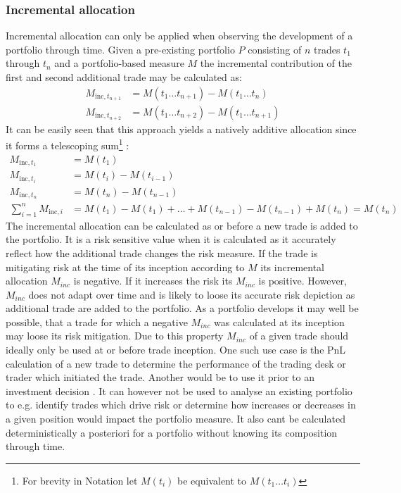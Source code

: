 \documentclass[12pt,a4paper]{article}
\let\footnoteOld\footnote		%
\renewcommand{\footnote}[1]{\linespread{1.0}\footnoteOld{#1}\linespread{1.2}}		%
\begin{document}
\subsubsection{Incremental allocation}
Incremental allocation can only be applied when observing the development of a portfolio through time. Given a pre-existing portfolio $P$ consisting of $n$ trades $t_1$ through $t_n$ and a portfolio-based measure $M$ the incremental contribution of the first and second additional trade may be calculated as:
\begin{align*}
M_{\text{inc},t_{n+1}} & =M\left(t_1\dots t_{n+1}\right)- M\left(t_1\dots t_{n}\right) \\
M_{\text{inc},t_{n+2}} & =M\left(t_1\dots t_{n+2}\right)- M\left(t_1\dots t_{n+1}\right)
\end{align*}
It can be easily seen that this approach yields a natively additive allocation since it forms a telescoping sum\footnote{For brevity in Notation let $M(t_i)$ be equivalent to $M(t_1\dots t_i)$ 
} :
\begin{align*}
M_{\text{inc},t_1}&=M(t_1) \\
M_{\text{inc},t_i}&= M(t_i)-M(t_{i-1}) \\
M_{\text{inc},t_n}&= M(t_n) - M(t_{n-1})\\
\sum_{i=1}^{n}{M_{\text{inc},i}} &= M(t_1)-M(t_1)+\dots+M(t_{n-1})-M(t_{n-1})+M(t_n) = M(t_n)
\end{align*}
The incremental allocation can be calculated as or before a new trade is added to the portfolio. It is a risk sensitive value when it is calculated as it accurately reflect how the additional trade changes the risk measure. If the trade is mitigating risk at the time of its inception according to $M$ its incremental allocation $M_{inc}$ is negative. If it increases the risk its $M_{inc}$ is positive. However, $M_{inc}$ does not adapt over time and is likely to loose its accurate risk depiction as additional trade are added to the portfolio. As a portfolio develops it may well be possible, that a trade for which a negative $M_{inc}$ was calculated at its inception may loose its risk mitigation. Due to this property $M_{inc}$ of a given trade should ideally only be used at or before trade inception. One such use case is the PnL calculation of a new trade to determine the performance of the trading desk or trader which initiated the trade. Another would be to use it prior to an investment decision \cite{tibiletti2001incremental}. It can however not be used to analyse an existing portfolio to e.g. identify trades which drive risk or determine how increases or decreases in a given position would impact the portfolio measure. It also cant be calculated deterministically a posteriori for a portfolio without knowing its composition through time.
\end{document}
